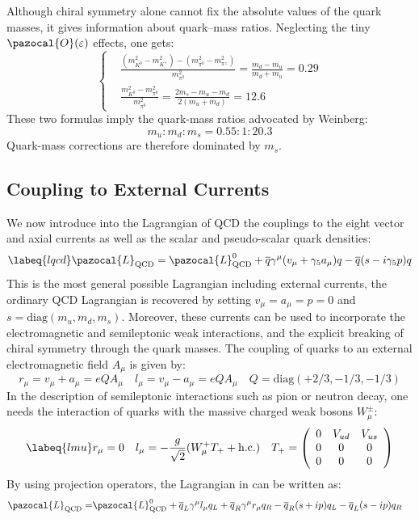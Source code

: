 \documentclass[../main.tex]{subfiles}
\begin{document}
Although chiral symmetry alone cannot fix the absolute values of the
quark masses, it gives information about quark–mass ratios. Neglecting
the tiny $\pazocal{O}(\varepsilon)$ effects, one gets:
\[
\left\{
\begin{aligned}
&\frac{(m_{K^0}^2-m_{K^+}^2)-(m_{\pi^0}^2-m_{\pi^\pm}^2)}{m_{\pi^0}^2}=\frac{m_d-m_u}{m_d+m_u}=0.29\\
&\frac{m_{K^0}^2-m_{\pi^0}^2}{m_{\pi^0}^2}=\frac{2m_s-m_u-m_d}{2(m_u+m_d)}=12.6
\end{aligned}
\right.
\]
These two formulas imply the quark-mass ratios advocated by Weinberg:
\[
m_u:m_d:m_s=0.55:1:20.3
\]
Quark-mass corrections are therefore dominated by $m_s$.
\subsection{Coupling to External Currents}
We now introduce into the Lagrangian of QCD the couplings to the eight vector and axial currents as well as the scalar and pseudo-scalar quark densities:
\begin{equation}
\labeq{lqcd}
\pazocal{L}_{\text{QCD}}=\pazocal{L}_{\text{QCD}}^0+\overline{q}\gamma^\mu(v_\mu+\gamma_5a_\mu)q-\overline{q}(s-i\gamma_5p)q
\end{equation}
This is the most general possible Lagrangian including external currents, the ordinary QCD Lagrangian is recovered by setting $v_\mu=a_\mu=p=0$ and $s=\text{diag}(m_u,m_d,m_s)$. Moreover, these currents can be used to incorporate the electromagnetic and semileptonic weak interactions, and the explicit breaking of chiral symmetry through the quark masses. The coupling of quarks to an external electromagnetic field $A_\mu$ is given by:
\[
r_\mu=v_\mu+a_\mu=eQA_\mu \quad l_\mu=v_\mu-a_\mu=eQA_\mu \quad Q=\text{diag}(+2/3,-1/3,-1/3)
\]
In the description of semileptonic interactions such as pion or neutron decay, one needs the interaction of quarks with the massive charged weak bosons $W_\mu^\pm$:
\begin{equation}
\labeq{lmu}
r_\mu=0 \quad l_\mu=-\frac{g}{\sqrt{2}}(W_\mu^+T_++\text{h.c.}) \quad T_+=\left(\begin{array}{ccc}
    0 & V_{ud} & V_{us} \\
    0 & 0 & 0 \\
    0 & 0 & 0
\end{array}\right)
\end{equation}
By using projection operators, the Lagrangian in  can be written as:
\[
\begin{aligned}
\pazocal{L}_{\text{QCD}}=&\pazocal{L}_{\text{QCD}}^0+\overline{q}_L\gamma^\mu l_\mu q_L+\overline{q}_R\gamma^\mu r_\mu q_R-\overline{q}_R(s+ip)q_L-\overline{q}_L(s-ip)q_R
\end{aligned}
\]
\end{document}
